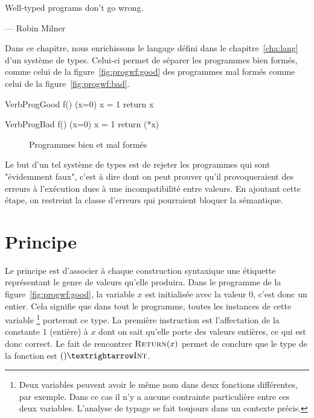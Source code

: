 \epigraph{Well-typed programs don't go wrong.}
{--- \textup{Robin Milner}}

Dans ce chapitre, nous enrichissons le langage défini dans le
chapitre~\ref{cha:lang} d'un système de types. Celui-ci permet de séparer les
programmes bien formés, comme celui de la figure~\ref{fig:progwf:good} des
programmes mal formés comme celui de la figure~\ref{fig:progwf:bad}.

\begin{SaveVerbatim}[]{VerbProgGood}
f()
(x=0)
{
  x = 1
  return x
}
\end{SaveVerbatim}

\begin{SaveVerbatim}[]{VerbProgBad}
f()
(x=0)
{
  x = 1
  return (*x)
}
\end{SaveVerbatim}

\begin{figure}

  \centering

  \hspace{2cm}

  \caption{Programmes bien et mal formés}
  \label{fig:progwf}

\end{figure}

Le but d'un tel système de types est de rejeter les programmes qui sont
"évidemment faux", c'est à dire dont on peut prouver qu'il provoqueraient des
erreurs à l'exécution dues à une incompatibilité entre valeurs. En ajoutant
cette étape, on restreint la classe d'erreurs qui pourraient bloquer la
sémantique.

\section{Principe}

Le principe est d'associer à chaque construction syntaxique une étiquette
représentant le genre de valeurs qu'elle produira. Dans le programme de la
figure~\ref{fig:progwf:good}, la variable $x$ est initialisée avec la valeur
$0$, c'est donc un entier. Cela signifie que dans tout le programme, toutes les
instances de cette variable
\footnote{Deux variables peuvent avoir le même nom dans deux fonctions
  différentes, par exemple. Dans ce cas il n'y a aucune contrainte particulière
  entre ces deux variables. L'analyse de typage se fait toujours dans un
  contexte précis.
}
porteront ce type. La première instruction est l'affectation de la constante $1$
(entière) à $x$ dont on sait qu'elle porte des valeurs entières, ce qui est donc
correct. Le fait de rencontrer $\textsc{Return}(x)$ permet de conclure que le type de
la fonction est $() → \tInt$.

